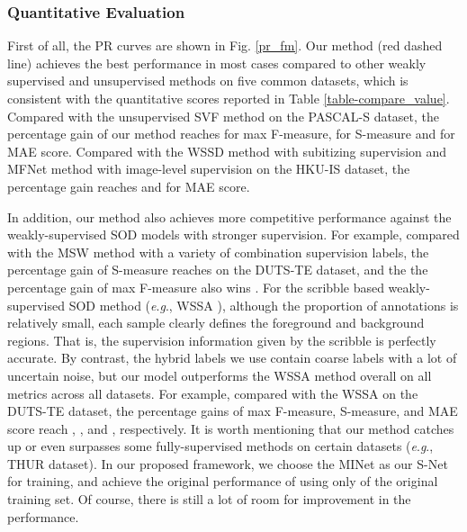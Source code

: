 \documentclass[journal]{IEEEtran}
\newcommand{\eg}{\textit{e}.\textit{g}.}
\begin{document}
\subsubsection{Quantitative Evaluation}
First of all, the PR curves are shown in Fig. \ref{pr_fm}. Our method (red dashed line) achieves the best performance in most cases compared to other weakly supervised and unsupervised methods on five common datasets, which is consistent with the quantitative scores reported in Table \ref{table-compare_value}.
Compared with the unsupervised SVF method \cite{zhang2017supervision} on the PASCAL-S dataset, the percentage gain of our method reaches  for max F-measure,  for S-measure and  for MAE score.
Compared with the WSSD method with subitizing supervision \cite{DBLP:journals/tcsv/ZhengTZML21} and MFNet method with image-level supervision \cite{DBLP:conf/iccv/PiaoWZL21} on the HKU-IS dataset, the percentage gain reaches  and  for MAE score.


In addition, our method also achieves more competitive performance against the weakly-supervised SOD models with stronger supervision.
For example, compared with the MSW method \cite{zeng2019multi} with a variety of combination supervision labels, the percentage gain of S-measure reaches  on the DUTS-TE dataset, and the the percentage gain of max F-measure also wins .
For the scribble based weakly-supervised SOD method (\eg, WSSA \cite{zhang2020weakly}), although the proportion of annotations is relatively small, each sample clearly defines the foreground and background regions. That is, the supervision information given by the scribble is perfectly accurate.
By contrast, the hybrid labels we use contain  coarse labels with a lot of uncertain noise, but our model outperforms the WSSA method overall on all metrics across all datasets.
For example, compared with the WSSA \cite{zhang2020weakly} on the DUTS-TE dataset, the percentage gains of max F-measure, S-measure, and MAE score reach , , and , respectively.
It is worth mentioning that our method catches up or even surpasses some fully-supervised methods on certain datasets (\eg, THUR dataset).
In our proposed framework, we choose the MINet \cite{DBLP:conf/cvpr/PangZZL20} as our S-Net for training, and achieve the original performance of  using only  of the original training set. Of course, there is still a lot of room for improvement in the performance.
\end{document}
